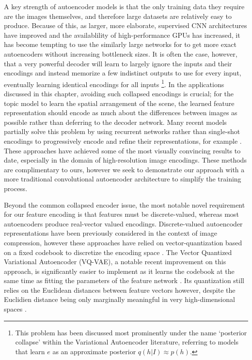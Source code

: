 A key strength of autoencoder models is that the only training data they require are the images themselves, and therefore large datasets are relatively easy to produce. Because of this, as larger, more elaborate, supervised CNN architectures have improved and the availablility of high-performance GPUs has increased, it has become tempting to use the similarly large networks for to get more exact autoencoders without increasing bottleneck sizes. It is often the case, however, that a very powerful decoder will learn to largely ignore the inputs and their encodings and instead memorize a few indistinct outputs to use for every input, eventually learning identical encodings for all inputs \citep{vincent2010stacked,Chen2016}\footnote{This problem has been discussed most prominently under the name `posterior collapse' within the Variational Autoencoder literature, referring to models that learn $e$ as an approximate posterior $q(h | I) \approx p(h)$.}. In the applications discussed in this chapter, avoiding such collapsed encodings is crucial; for the topic model to learn the spatial arrangement of the scene, the learned feature representation should encode as much about the differences between images as possible rather than deferring to the decoder network. Many recent models partially solve this problem by using recurrent networks rather than single-shot encodings to progressively encode and refine their representations, for example \citep{OordPixelCNN,Chen2016,Gregor2016}. These approaches have achieved some of the most visually convincing results to date, especially in the domain of high-resolution image encodings. These methods are complimentary to ours, however we seek to demonstrate our approach with a more traditional convolutional autoencoder architecture to simplify the training process.

Beyond the common collapsed encoder issue, the most notable novel requirement for our feature encoding is that features must be discrete-valued, whereas most autoencoders produce real-vector valued encodings. Discrete-valued autoencoder representations have been previously considered in the context of image compression, however these approaches have relied on vector-quantization based on a fixed codebook to discretize the encoding space \citep{AgustssonSoftToHardVQ}. The Vector Quantized Variational Autoencoder (VQ-VAE), a notable recent improvement on this approach, is significantly easier to implement as it learns the codebook at the same time as fitting the parameters of the feature network \citep{vqvae2017}. Its quantization still relies on the Euclidean distances between feature vectors however, despite the Euclidien distance being only marginally meaningful in very high-dimensional spaces \citep{aggarwal2001metrics}.

